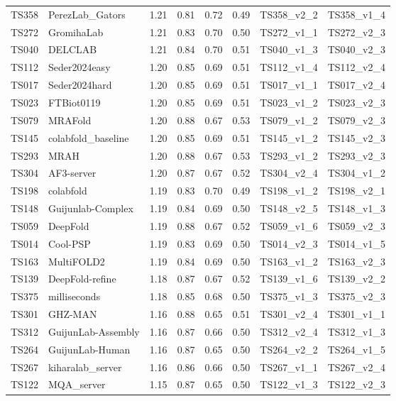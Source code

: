 \begin{longtable}{llllllll}
TS358 & PerezLab\_Gators & 1.21 & 0.81 & 0.72 & 0.49 & TS358\_v2\_2 & TS358\_v1\_4 \\ 
TS272 & GromihaLab & 1.21 & 0.83 & 0.70 & 0.50 & TS272\_v1\_1 & TS272\_v2\_3 \\ 
TS040 & DELCLAB & 1.21 & 0.84 & 0.70 & 0.51 & TS040\_v1\_3 & TS040\_v2\_3 \\ 
TS112 & Seder2024easy & 1.20 & 0.85 & 0.69 & 0.51 & TS112\_v1\_4 & TS112\_v2\_4 \\ 
TS017 & Seder2024hard & 1.20 & 0.85 & 0.69 & 0.51 & TS017\_v1\_1 & TS017\_v2\_4 \\ 
TS023 & FTBiot0119 & 1.20 & 0.85 & 0.69 & 0.51 & TS023\_v1\_2 & TS023\_v2\_3 \\ 
TS079 & MRAFold & 1.20 & 0.88 & 0.67 & 0.53 & TS079\_v1\_2 & TS079\_v2\_3 \\ 
TS145 & colabfold\_baseline & 1.20 & 0.85 & 0.69 & 0.51 & TS145\_v1\_2 & TS145\_v2\_3 \\ 
TS293 & MRAH & 1.20 & 0.88 & 0.67 & 0.53 & TS293\_v1\_2 & TS293\_v2\_3 \\ 
TS304 & AF3-server & 1.20 & 0.87 & 0.67 & 0.52 & TS304\_v2\_4 & TS304\_v1\_2 \\ 
TS198 & colabfold & 1.19 & 0.83 & 0.70 & 0.49 & TS198\_v1\_2 & TS198\_v2\_1 \\ 
TS148 & Guijunlab-Complex & 1.19 & 0.84 & 0.69 & 0.50 & TS148\_v2\_5 & TS148\_v1\_3 \\ 
TS059 & DeepFold & 1.19 & 0.88 & 0.67 & 0.52 & TS059\_v1\_6 & TS059\_v2\_3 \\ 
TS014 & Cool-PSP & 1.19 & 0.83 & 0.69 & 0.50 & TS014\_v2\_3 & TS014\_v1\_5 \\ 
TS163 & MultiFOLD2 & 1.19 & 0.84 & 0.69 & 0.50 & TS163\_v1\_2 & TS163\_v2\_3 \\ 
TS139 & DeepFold-refine & 1.18 & 0.87 & 0.67 & 0.52 & TS139\_v1\_6 & TS139\_v2\_2 \\ 
TS375 & milliseconds & 1.18 & 0.85 & 0.68 & 0.50 & TS375\_v1\_3 & TS375\_v2\_3 \\ 
TS301 & GHZ-MAN & 1.16 & 0.88 & 0.65 & 0.51 & TS301\_v2\_4 & TS301\_v1\_1 \\ 
TS312 & GuijunLab-Assembly & 1.16 & 0.87 & 0.66 & 0.50 & TS312\_v2\_4 & TS312\_v1\_3 \\ 
TS264 & GuijunLab-Human & 1.16 & 0.87 & 0.65 & 0.50 & TS264\_v2\_2 & TS264\_v1\_5 \\ 
TS267 & kiharalab\_server & 1.16 & 0.86 & 0.66 & 0.50 & TS267\_v1\_1 & TS267\_v2\_4 \\ 
TS122 & MQA\_server & 1.15 & 0.87 & 0.65 & 0.50 & TS122\_v1\_3 & TS122\_v2\_3 \\ 

\end{longtable}
